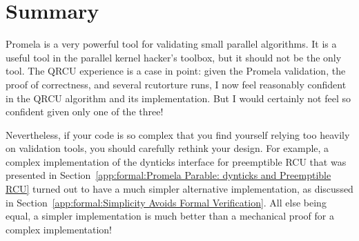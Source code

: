 \section{Summary}
\label{app:formal:Summary}

Promela is a very powerful tool for validating small parallel algorithms.
It is a useful tool in the parallel kernel hacker's toolbox, but
it should not be the only tool.
The QRCU experience is a case in point: given the Promela validation,
the proof of correctness, and several
rcutorture
runs, I now feel
reasonably confident in the QRCU algorithm and its implementation.
But I would certainly not feel so confident given only one of the three!

Nevertheless, if your code is so complex that you find yourself
relying too heavily on validation
tools, you should carefully rethink your design.
For example, a complex implementation of the dynticks interface for
preemptible RCU that was presented in
Section~\ref{app:formal:Promela Parable: dynticks and Preemptible RCU}
turned out to
have a much simpler alternative implementation, as discussed in
Section~\ref{app:formal:Simplicity Avoids Formal Verification}.
All else being equal, a simpler implementation is much better than
a mechanical proof for a complex implementation!
